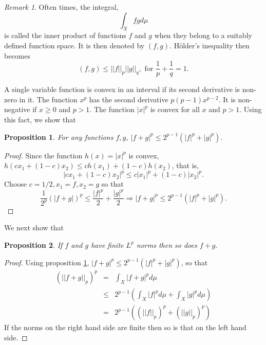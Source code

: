 \documentclass{article}
\theoremstyle{plain}
\numberwithin{thm}{section}
\theoremstyle{plain}
\newtheorem{prop}{Proposition}
\numberwithin{prop}{section}
\theoremstyle{definition}
\numberwithin{defn}{section}
\theoremstyle{remark}
\newtheorem*{rem}{Remark}
\theoremstyle{plain}
\numberwithin{cor}{section}
\numberwithin{equation}{section}
\begin{document}
\begin{rem}
Often times, the integral,
\[
\int_X fgd\mu
\]
is called the inner product of functions $f$ and $g$ when they belong to a 
suitably defined function space. It is then denoted by $(f, g)$. H\"{o}lder's
inequality then becomes
\begin{equation}\label{s5e3}
(f, g) \le ||f||_p||g||_q, \text{ for } \frac{1}{p} + \frac{1}{q} = 1.
\end{equation}
\end{rem}

A single variable function is convex in an interval if its second derivative is 
non-zero in it. The function $x^p$ has the second derivative $p(p-1)x^{p-2}$. It
is non-negative if $x \ge 0$ and $p > 1$. The function $|x|^p$ is convex for all
$x$ and $p > 1$. Using this fact, we show that
\begin{prop}\label{s5p2}
For any functions $f, g$, $|f + g|^p \le 2^{p-1}(|f|^p + |g|^p)$.
\end{prop}
\begin{proof}
Since the function $h(x) = |x|^p$ is convex, $h(cx_1 + (1 - c)x_2) \le ch(x_1) + 
(1-c)h(x_2)$, that is,
\[
|cx_1 + (1 - c)x_2|^p \le c|x_1|^p + (1-c)|x_2|^p.
\]
Choose $c = 1/2, x_1 = f, x_2 = g$ so that
\[
\frac{1}{2^p}(|f + g|)^p \le \frac{|f|^p}{2} + \frac{|g|^p}{2}
\Rightarrow |f + g|^p \le 2^{p-1}(|f|^p + |g|^p).
\]
\end{proof}

We next show that 
\begin{prop}\label{s5p3}
If $f$ and $g$ have finite $L^p$ norms then so does $f + g$.
\end{prop}
\begin{proof}
Using proposition \ref{s5p2}, $|f + g|^p \le 2^{p-1}(|f|^p + |g|^p)$, so that
\begin{eqnarray*}
(||f + g||_p)^p &=& \int_X |f + g|^p d\mu \\
 &\le& 2^{p-1}\left(\int_X |f|^p d\mu + \int_X |g|^p d\mu\right) \\
 &=& 2^{p-1}\left((||f||_p)^p + (||g||_p)^p\right)
\end{eqnarray*}
If the norms on the right hand side are finite then so is that on the left hand
side.
\end{proof}
\end{document}
